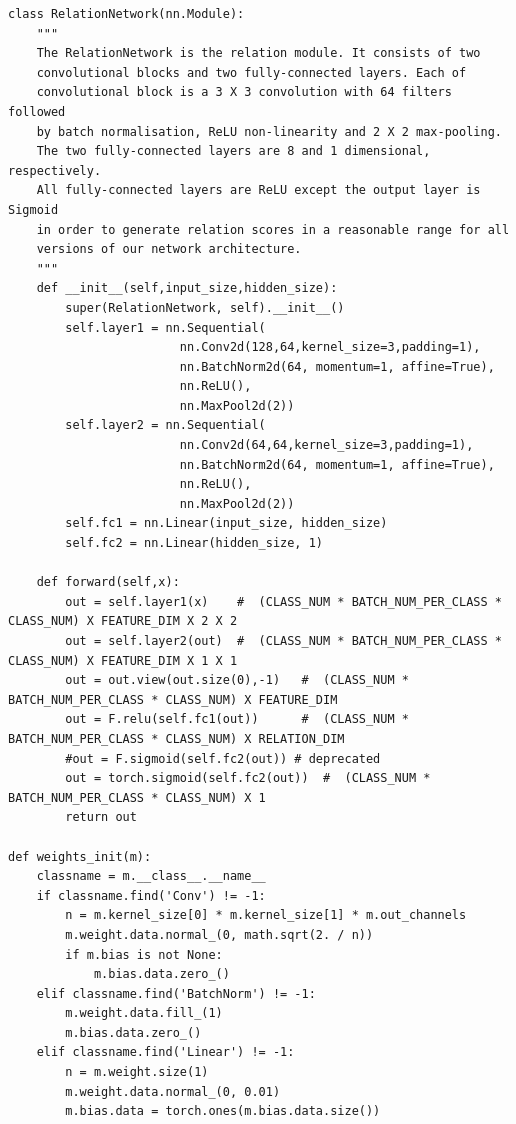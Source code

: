 \documentclass[12pt,a4paper,titlepage]{article}
\begin{document}
\begin{lstlisting}[language=iPython,firstnumber=1, caption=relation\_network.py, label=relation network,captionpos=b]
class RelationNetwork(nn.Module):
    """
    The RelationNetwork is the relation module. It consists of two 
    convolutional blocks and two fully-connected layers. Each of 
    convolutional block is a 3 X 3 convolution with 64 filters followed 
    by batch normalisation, ReLU non-linearity and 2 X 2 max-pooling.
    The two fully-connected layers are 8 and 1 dimensional, respectively. 
    All fully-connected layers are ReLU except the output layer is Sigmoid 
    in order to generate relation scores in a reasonable range for all 
    versions of our network architecture.
    """
    def __init__(self,input_size,hidden_size):
        super(RelationNetwork, self).__init__()
        self.layer1 = nn.Sequential(
                        nn.Conv2d(128,64,kernel_size=3,padding=1),
                        nn.BatchNorm2d(64, momentum=1, affine=True),
                        nn.ReLU(),
                        nn.MaxPool2d(2))
        self.layer2 = nn.Sequential(
                        nn.Conv2d(64,64,kernel_size=3,padding=1),
                        nn.BatchNorm2d(64, momentum=1, affine=True),
                        nn.ReLU(),
                        nn.MaxPool2d(2))
        self.fc1 = nn.Linear(input_size, hidden_size)
        self.fc2 = nn.Linear(hidden_size, 1)

    def forward(self,x):
        out = self.layer1(x)    #  (CLASS_NUM * BATCH_NUM_PER_CLASS * CLASS_NUM) X FEATURE_DIM X 2 X 2
        out = self.layer2(out)  #  (CLASS_NUM * BATCH_NUM_PER_CLASS * CLASS_NUM) X FEATURE_DIM X 1 X 1
        out = out.view(out.size(0),-1)   #  (CLASS_NUM * BATCH_NUM_PER_CLASS * CLASS_NUM) X FEATURE_DIM
        out = F.relu(self.fc1(out))      #  (CLASS_NUM * BATCH_NUM_PER_CLASS * CLASS_NUM) X RELATION_DIM
        #out = F.sigmoid(self.fc2(out)) # deprecated
        out = torch.sigmoid(self.fc2(out))  #  (CLASS_NUM * BATCH_NUM_PER_CLASS * CLASS_NUM) X 1
        return out

def weights_init(m):
    classname = m.__class__.__name__
    if classname.find('Conv') != -1:
        n = m.kernel_size[0] * m.kernel_size[1] * m.out_channels
        m.weight.data.normal_(0, math.sqrt(2. / n))
        if m.bias is not None:
            m.bias.data.zero_()
    elif classname.find('BatchNorm') != -1:
        m.weight.data.fill_(1)
        m.bias.data.zero_()
    elif classname.find('Linear') != -1:
        n = m.weight.size(1)
        m.weight.data.normal_(0, 0.01)
        m.bias.data = torch.ones(m.bias.data.size())
\end{lstlisting}
\end{document}
